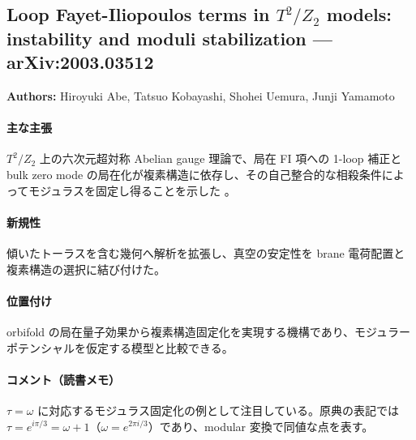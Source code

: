 \subsection{Loop Fayet-Iliopoulos terms in $T^2/Z_2$ models: instability and moduli stabilization --- arXiv:2003.03512}

\textbf{Authors:} Hiroyuki Abe, Tatsuo Kobayashi, Shohei Uemura, Junji Yamamoto

\paragraph{主な主張}
$T^2/Z_2$ 上の六次元超対称 Abelian gauge 理論で、局在 FI 項への 1-loop 補正と bulk zero mode の局在化が複素構造に依存し、その自己整合的な相殺条件によってモジュラスを固定し得ることを示した \cite{Abe:2020vmv}。

\paragraph{新規性}
傾いたトーラスを含む幾何へ解析を拡張し、真空の安定性を brane 電荷配置と複素構造の選択に結び付けた。

\paragraph{位置付け}
orbifold の局在量子効果から複素構造固定化を実現する機構であり、モジュラーポテンシャルを仮定する模型と比較できる。

\paragraph{コメント（読書メモ）}
$\tau=\omega$ に対応するモジュラス固定化の例として注目している。原典の表記では $\tau=e^{i\pi/3}=\omega+1$（$\omega=e^{2\pi i/3}$）であり、modular 変換で同値な点を表す。
